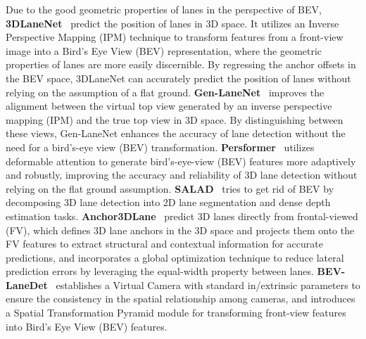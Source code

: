 Due to the good geometric properties of lanes in the perspective of BEV, \textbf{3DLaneNet}~\cite{garnett20193d} predict the position of lanes in 3D space.
It utilizes an Inverse Perspective Mapping (IPM) technique to transform features from a front-view image into a Bird's Eye View (BEV) representation, where the geometric properties of lanes are more easily discernible.
By regressing the anchor offsets in the BEV space, 3DLaneNet can accurately predict the position of lanes without relying on the assumption of a flat ground.
\textbf{Gen-LaneNet}~\cite{guo2020gen} improves the alignment between the virtual top view generated by an inverse perspective mapping (IPM) and the true top view in 3D space.
By distinguishing between these views, Gen-LaneNet enhances the accuracy of lane detection without the need for a bird's-eye view (BEV) transformation.
\textbf{Persformer}~\cite{chen2022persformer} utilizes deformable attention to generate bird's-eye-view (BEV) features more adaptively and robustly, improving the accuracy and reliability of 3D lane detection without relying on the flat ground assumption.
\textbf{SALAD}~\cite{yan2022once} tries to get rid of BEV by decomposing 3D lane detection into 2D lane segmentation and dense depth estimation tasks.
\textbf{Anchor3DLane}~\cite{huang2023anchor3dlane} predict 3D lanes directly from frontal-viewed (FV), which defines 3D lane anchors in the 3D space and projects them onto the FV features to extract structural and contextual information for accurate predictions, and incorporates a global optimization technique to reduce lateral prediction errors by leveraging the equal-width property between lanes.
\textbf{BEV-LaneDet}~\cite{wang2023bev} establishes a Virtual Camera with standard in/extrinsic parameters to ensure the consistency in the spatial relationship among cameras, and introduces a Spatial Transformation Pyramid module for transforming front-view features into Bird's Eye View (BEV) features.